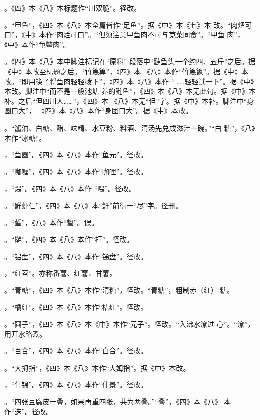 \begin{list}{}
。《四》本《八》本标题作“川双脆”。径改。

。“甲鱼”，《四》本《八》本全篇皆作“足鱼”。据《中》本《七》本
改。“肉𤆵可口”，《中》本作“肉烂可口”。“但须注意甲鱼肉不可与苋菜同食”。“甲鱼
肉”，《中》本作“龟鳖肉”。

。《四》本《八》本中脚注标记{\footnotesize{}}在“原料”
段落中“鲢鱼头一个约四、五斤”之后。据《中》本改至标题之后。“竹篾箅”，《四》本
《八》本作“竹篾篦”。据《中》本改。“即用筷子将鱼肉轻轻拨下”，《四》本《八》本作
“……轻轻试一下”。据《中》本改。脚注{\footnotesize{}}中“而不是一般池塘
养的鲢鱼”，《四》本《八》本无此句。据《中》本补。之后“但四川人……”，《四》本
《八》本无“但”字。据《中》本补。脚注{\footnotesize{}}中“身圆口大”，
《四》本《八》本作“身团口大”。据《中》本改。

。“酱油、白糖、醋、味精、水豆粉、料酒、清汤先兑成滋汁一碗。”“白
糖”，《八》本作“冰糖”。

，“鱼圆”。《四》本《八》本作“鱼元”。径改。

。“咖喱”，《四》本《八》本作“咖哩”。径改。

，“煨”。《四》本《八》本作
“喂”。径改。

。“鲜虾仁”，《四》本《八》本“鲜”前衍一“尽”字。径删。

。“蜇”，《八》本作“蛰”。误。

。“擀”，《四》本《八》本作“扞”。径改。

。“铝盘”，《四》本《八》本作“锑盘”。径改。

，“红苕”。亦称番薯、红薯、甘薯。

。“青糖”，《四》本《八》本作“清糖”，径改。“青糖”，粗制赤（红）
糖。

，“橘红”。《四》本《八》本作“桔红”。径改。

。“圆子”，《四》本《八》本《中》本作“元子”。径改。“入沸水潦过
心”。“潦”，用开水略煮。

。“百合”，《四》本《八》本作“白合”。径改。

。“大拇指”，《四》本《八》本作“大姆指”。据《中》本改。

，“什锦”。《四》本《八》本作“什景”。径改。

。“四张豆腐皮一叠，如果再重四张，共为两叠。”“叠”，《四》本《八》
本作“迭”。径改。


\end{list}
